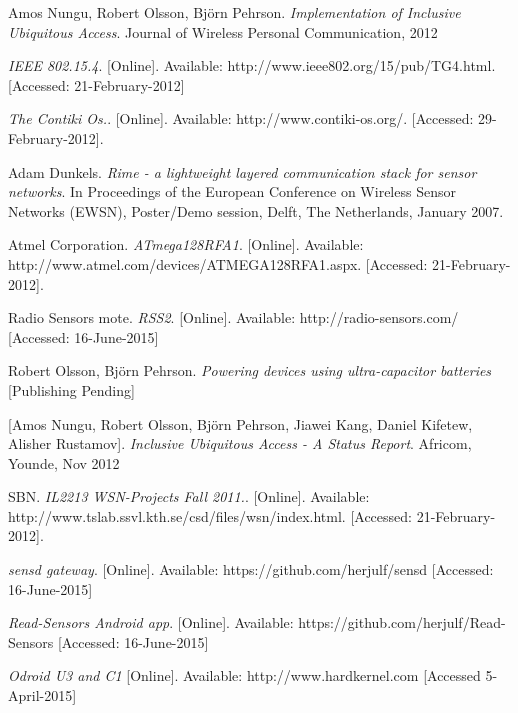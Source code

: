 \documentclass[conference, a4paper,10pt,twocolumn]{IEEEtran}
\begin{document}
\begin{thebibliography}{1}

 Amos Nungu, Robert Olsson, Bj\"{o}rn Pehrson. \emph{Implementation of Inclusive Ubiquitous Access}. 
Journal of Wireless Personal Communication, 2012

  \emph{IEEE 802.15.4}. 
[Online]. Available: http://www.ieee802.org/15/pub/TG4.html. [Accessed: 21-February-2012]

  \emph{The Contiki Os.}. 
[Online]. Available: http://www.contiki-os.org/. [Accessed: 29-February-2012].

 Adam Dunkels. \emph{Rime - a lightweight layered communication stack for sensor networks}.   In Proceedings of the European Conference on Wireless Sensor Networks (EWSN), Poster/Demo session, Delft, The Netherlands, January 2007.

 Atmel Corporation. \emph{ATmega128RFA1}. 
[Online]. Available: http://www.atmel.com/devices/ATMEGA128RFA1.aspx. [Accessed: 21-February-2012].

 Radio Sensors mote. \emph{RSS2}. 
[Online]. Available: http://radio-sensors.com/ [Accessed: 16-June-2015]

 Robert Olsson, Bj\"{o}rn Pehrson. \emph{Powering devices using ultra-capacitor batteries}
[Publishing Pending]

 [Amos Nungu, Robert Olsson, Bj\"{o}rn Pehrson, Jiawei Kang, Daniel Kifetew, Alisher Rustamov]. \emph{Inclusive Ubiquitous Access - A Status Report}. 
Africom, Younde, Nov 2012

 SBN. \emph{IL2213 WSN-Projects Fall 2011.}. 
[Online]. Available: http://www.tslab.ssvl.kth.se/csd/files/wsn/index.html. [Accessed: 21-February-2012].

  \emph{sensd gateway}. 
[Online]. Available: https://github.com/herjulf/sensd [Accessed: 16-June-2015]

  \emph{Read-Sensors Android app}. 
[Online]. Available: https://github.com/herjulf/Read-Sensors [Accessed: 16-June-2015]


 \emph{Odroid U3 and C1}
[Online]. Available: http://www.hardkernel.com [Accessed 5-April-2015]
\end{thebibliography}
\end{document}
